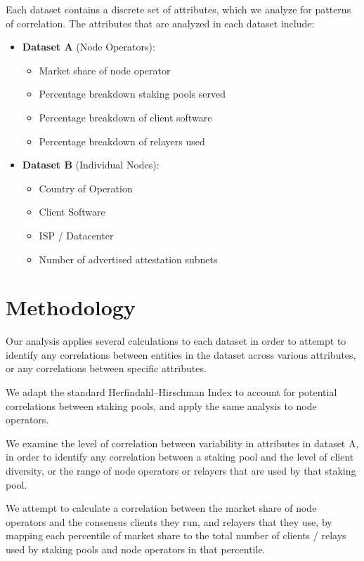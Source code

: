 \documentclass[conference]{IEEEtran}
\begin{document}
Each dataset contains a discrete set of attributes, which we analyze for patterns of correlation.  The attributes that are analyzed in each dataset include:

\begin{itemize}
    \item \textbf{Dataset A} (Node Operators):
    \begin{itemize}
        \item Market share of node operator
        \item Percentage breakdown staking pools served
        \item Percentage breakdown of client software
        \item Percentage breakdown of relayers used
    \end{itemize}
    \item \textbf{Dataset B} (Individual Nodes):
            \begin{itemize}
                \item Country of Operation
                \item Client Software
                \item ISP / Datacenter
                \item Number of advertised attestation subnets
            \end{itemize}
\end{itemize}

\section{Methodology}

Our analysis applies several calculations to each dataset in order to attempt to identify any correlations between entities in the dataset across various attributes, or any correlations between specific attributes.

We adapt the standard Herfindahl–Hirschman Index to account for potential correlations between staking pools, and apply the same analysis to node operators.

We examine the level of correlation between variability in attributes in dataset A, in order to identify any correlation between a staking pool and the level of client diversity, or the range of node operators or relayers that are used by that staking pool.

We attempt to calculate a correlation between the market share of node operators and the consensus clients they run, and relayers that they use, by mapping each percentile of market share to the total number of clients / relays used by staking pools and node operators in that percentile.
\end{document}
